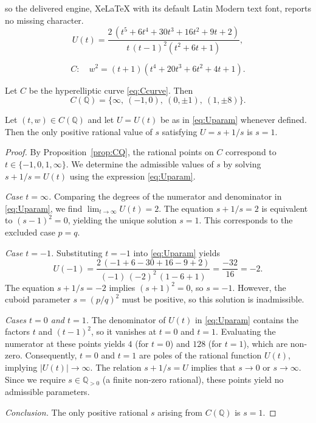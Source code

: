 \documentclass[10pt,a4paper]{amsart}
\begin{document}
so the delivered engine, XeLaTeX with its default Latin Modern text font, reports no missing character.
\begin{equation}\label{eq:Uparam}
U(t)=\frac{2\,(t^{5}+6t^{4}+30t^{3}+16t^{2}+9t+2)}{t\,(t-1)^{2}(t^{2}+6t+1)},
\end{equation}

\begin{equation}\label{eq:Ccurve}
C:\quad w^{2}=(t+1)(t^{4}+20t^{3}+6t^{2}+4t+1).
\end{equation}

\begin{proposition}\label{prop:CQ}
Let $C$ be the hyperelliptic curve \eqref{eq:Ccurve}.
Then
\[
C(\mathbb{Q})=\bigl\{\infty,\ (-1,0),\ (0,\pm 1),\ (1,\pm 8)\bigr\}.
\]
\end{proposition}

\begin{lemma}\label{lem:noadmissible}
Let $(t,w)\in C(\mathbb{Q})$ and let $U=U(t)$ be as in \eqref{eq:Uparam} whenever defined.
Then the only positive rational value of $s$ satisfying $U=s+1/s$ is $s=1$.
\end{lemma}

\begin{proof}
By Proposition~\ref{prop:CQ}, the rational points on $C$ correspond to $t \in \{-1, 0, 1, \infty\}$. We determine the admissible values of $s$ by solving $s+1/s = U(t)$ using the expression \eqref{eq:Uparam}.

\smallskip
\noindent\emph{Case $t=\infty$.}
Comparing the degrees of the numerator and denominator in \eqref{eq:Uparam}, we find $\lim_{t\to\infty} U(t) = 2$. The equation $s+1/s=2$ is equivalent to $(s-1)^2=0$, yielding the unique solution $s=1$. This corresponds to the excluded case $p=q$.

\smallskip
\noindent\emph{Case $t=-1$.}
Substituting $t=-1$ into \eqref{eq:Uparam} yields
\[
U(-1) = \frac{2\,(-1+6-30+16-9+2)}{(-1)\,(-2)^{2}\,(1-6+1)} = \frac{-32}{16} = -2.
\]
The equation $s+1/s=-2$ implies $(s+1)^2=0$, so $s=-1$. However, the cuboid parameter $s=(p/q)^2$ must be positive, so this solution is inadmissible.

\smallskip
\noindent\emph{Cases $t=0$ and $t=1$.}
The denominator of $U(t)$ in \eqref{eq:Uparam} contains the factors $t$ and $(t-1)^2$, so it vanishes at $t=0$ and $t=1$. Evaluating the numerator at these points yields $4$ (for $t=0$) and $128$ (for $t=1$), which are non-zero.
Consequently, $t=0$ and $t=1$ are poles of the rational function $U(t)$, implying $|U(t)| \to \infty$.
The relation $s+1/s=U$ implies that $s \to 0$ or $s \to \infty$. Since we require $s \in \mathbb{Q}_{>0}$ (a finite non-zero rational), these points yield no admissible parameters.

\smallskip
\noindent\emph{Conclusion.}
The only positive rational $s$ arising from $C(\mathbb{Q})$ is $s=1$.
\end{proof}
\end{document}
